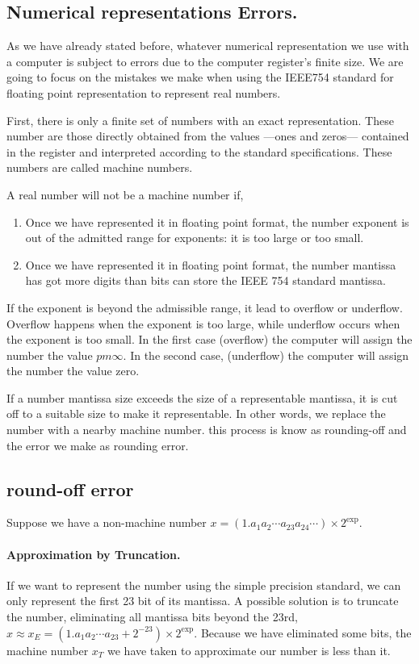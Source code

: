 \begin{paracol}{2}
\section{Numerical representations Errors.}
As we have already stated before, whatever numerical representation we use with a computer is subject to errors due to the computer register's finite size. We are going to focus on the mistakes we make when using the IEEE754 standard for floating point representation to represent real numbers.

First, there is only a finite set of numbers with an exact representation. These number are those directly obtained from the values ---ones and zeros---  contained in the register and interpreted according to the standard specifications. These numbers are called machine numbers.

A real number will not be a machine number if,
\begin{enumerate}
	\item Once we have represented it in floating point format, the number exponent is out of the admitted range for exponents: it is too large or too small.
	\item Once we have represented it in floating point format, the number mantissa has got more digits than bits can store the IEEE 754 standard mantissa.	  
\end{enumerate}
If the exponent is beyond the admissible range, it lead to overflow or underflow. Overflow happens when the exponent is too large, while underflow occurs when the exponent is too small. In the first case (overflow) the computer will assign the number the value $pm \infty$. In the second case, (underflow) the computer will assign the number the value zero.  

If a number mantissa size exceeds the size of a representable mantissa, it is cut off to a suitable size to make it representable. In other words, we replace the number with a nearby machine number. this process is know as rounding-off and the error we make as rounding error.

\subsection{round-off error}
Suppose we have a non-machine number $x=(1.a_1a_2\cdots a_{23}a_{24}\cdots)\times2^{\text{exp}}$.

\paragraph{Approximation by Truncation.} If we want to represent the number using the simple precision standard, we can only represent the first 23 bit of its mantissa. A possible solution is to truncate the number, eliminating all mantissa bits beyond the 23rd, $x\approx x_E=  (1.a_1a_2\cdots a_{23}+2^{-23})\times2^{\text{exp}}$. Because we have eliminated some bits, the machine number $x_T$ we have taken to approximate our number is less than it.
 

\end{paracol}
